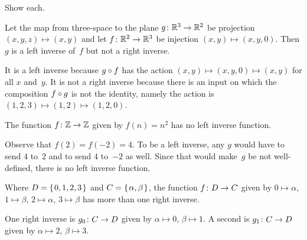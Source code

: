 \documentclass{ibl}  %
\begin{document}
\begin{problem} Show each.
\begin{exes}
\begin{exercise}
Let the map from three-space to the plane $\mbox{$g\colon \mathbb{R}^3\to \mathbb{R}^2$}$
be projection $(x,y,z)\mapsto(x,y)$
and let $\mbox{$f\colon \mathbb{R}^2\to \mathbb{R}^3$}$ be injection
$(x,y)\mapsto(x,y,0)$.
Then $g$ is a left inverse of~$f$ but not a right inverse.
\end{exercise}
\begin{answer}
It is a left inverse because $g\mathbin{\circ} f$ has the action
$(x,y)\mapsto(x,y,0)\mapsto(x,y)$ for all $x$ and~$y$.
It is not a right inverse because there is an 
input on which the composition $f\mathbin{\circ} g$ is not the identity, namely
the action is 
$(1,2,3)\mapsto(1,2)\mapsto(1,2,0)$.
\end{answer}
\begin{exercise}
The function $\mbox{$f\colon \mathbb{Z}\to \mathbb{Z}$}$ given by $f(n)=n^2$ has no left inverse function.
\end{exercise}
\begin{answer}
Observe that $f(2)=f(-2)=4$.
To be a left inverse, any $g$ would have to send $4$ to~$2$ and to send
$4$ to~$-2$ as well.
Since that would make~$g$ be not well-defined, there is no left inverse 
function.   
\end{answer}
\begin{exercise}
Where $D=\mbox{$\{\hspace{0.1em}0,1,2,3\hspace{0.1em}\}$}$ and $C=\mbox{$\{\hspace{0.1em}\alpha,\beta\hspace{0.1em}\}$}$,
the function $\mbox{$f\colon D\to C$}$ given by
$0\mapsto \alpha$, $1\mapsto\beta$, $2\mapsto\alpha$, $3\mapsto\beta$
has more than one right inverse.  
\end{exercise}
\begin{answer}
One right inverse is $\mbox{$g_0\colon C\to D$}$ given by $\alpha\mapsto 0$, 
$\beta\mapsto 1$.
A second is  
$\mbox{$g_1\colon C\to D$}$ given by $\alpha\mapsto 2$, 
$\beta\mapsto 3$.
\end{answer}
\end{exes}
\end{problem}
\end{document}
